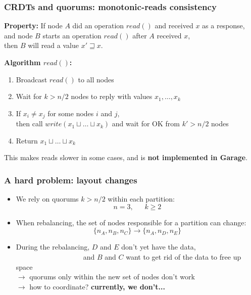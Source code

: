 \documentclass[aspectratio=169]{beamer}
\begin{document}
\begin{frame}
	\frametitle{CRDTs and quorums: monotonic-reads consistency}
	\textbf{Property:} If node $A$ did an operation $read()$ and received $x$ as a response,\\
		\hspace{2cm} and node $B$ starts an operation $read()$ after $A$ received $x$,\\
		\hspace{2cm} then $B$ will read a value $x' \sqsupseteq x$.

	\vspace{1em}

	\textbf{Algorithm $read()$:}
	\begin{enumerate}
		\item Broadcast $read()$ to all nodes
		\item Wait for $k > n/2$ nodes to reply with values $x_1, \dots, x_k$
		\item If $x_i \ne x_j$ for some nodes $i$ and $j$,\\
			\hspace{1cm}then call $write(x_1 \sqcup \dots \sqcup x_k)$ and wait for OK from $k' > n/2$ nodes
		\item Return $x_1 \sqcup \dots \sqcup x_k$
	\end{enumerate}

	\vspace{1em}

	This makes reads slower in some cases, and is \textbf{not implemented in Garage}.
\end{frame}

\begin{frame}
	\frametitle{A hard problem: layout changes}
	\begin{itemize}
		\item We rely on quorums $k > n/2$ within each partition:\\
			$$n=3,~~~~~~~k\ge 2$$
		\item When rebalancing, the set of nodes responsible for a partition can change:\\
			$$\{n_A, n_B, n_C\} \to \{n_A, n_D, n_E\}$$
			\vspace{.01em}
		\item During the rebalancing, $D$ and $E$ don't yet have the data,\\
			~~~~~~~~~~~~~~~~~~~and $B$ and $C$ want to get rid of the data to free up space\\
			\vspace{.2em}
			$\to$ quorums only within the new set of nodes don't work\\
			$\to$ how to coordinate? \textbf{currently, we don't...}

	\end{itemize}
\end{frame}
\end{document}

